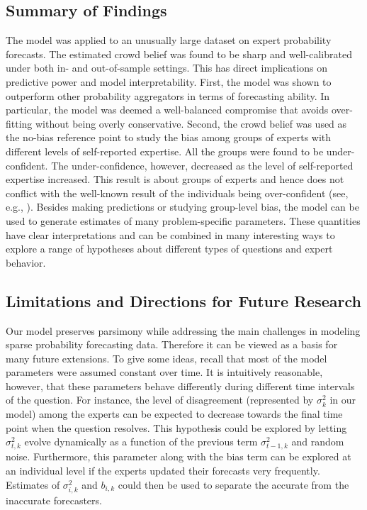 \documentclass[aoas, preprint]{imsart}
\numberwithin{equation}{section}
\theoremstyle{plain}
\begin{document}
\subsection{Summary of Findings}
The model was applied to an unusually large dataset on expert probability forecasts. The estimated crowd belief was found to be sharp and well-calibrated under both in- and out-of-sample settings. This has direct implications  on predictive power and model interpretability. First, the model was shown to outperform other probability aggregators in terms of forecasting ability. In particular, the model was deemed a well-balanced compromise that avoids over-fitting without being overly conservative. Second, the crowd belief was used as the no-bias reference point to study the bias among groups of experts with different levels of self-reported expertise. All the groups were found to be under-confident. The under-confidence, however, decreased as the level of self-reported expertise increased. This result is about groups of experts and hence does not conflict with the well-known result of the individuals being over-confident (see, e.g.,  \citet{lichtenstein1977calibration, morgan1992uncertainty, bier2004implications}). Besides making predictions or studying group-level bias, the model can be used to generate estimates of many problem-specific parameters. These quantities have clear interpretations and can be combined in many interesting ways to explore a range of hypotheses about different types of questions and expert behavior. 


\subsection{Limitations and Directions for Future Research}
Our model preserves parsimony while addressing the main challenges in modeling sparse probability forecasting data. Therefore it can be viewed as a basis for many future extensions. To give some ideas, recall that most of the model parameters were assumed constant over time. It is intuitively reasonable, however, that these parameters behave differently during different time intervals of the question.  For instance, the level of disagreement (represented by $\sigma^2_k$ in our model) among the experts can be expected to decrease towards the final time point when the question  resolves. This hypothesis could be explored by letting $\sigma^2_{t,k}$ evolve dynamically as a function of the previous term $\sigma^2_{t-1,k}$ and random noise. Furthermore, this parameter along with the bias term can be explored at an individual level if the experts updated their forecasts very frequently. Estimates of $\sigma_{i,k}^2$ and $b_{i,k}$ could then be used to separate the accurate from the inaccurate forecasters. 
\end{document}
